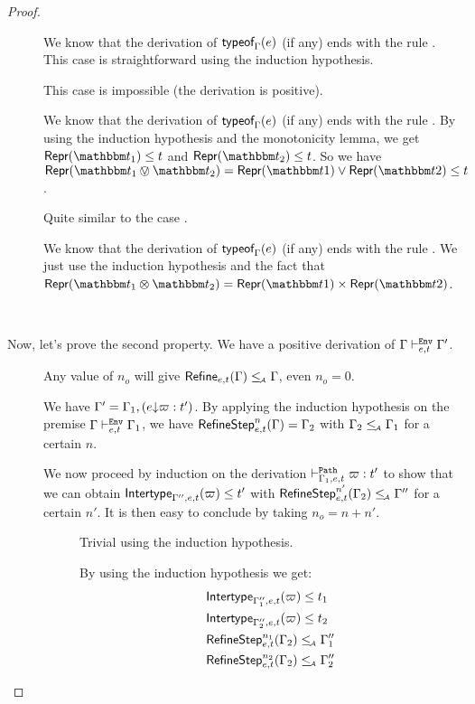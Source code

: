\documentclass[a4paper]{article}
\theoremstyle{definition}
\begin{document}
\begin{proof}
\begin{description}
    \item[] We know that the derivation of $\textsf{typeof}_{\Gamma}(e)$ (if any) ends with the rule .
    This case is straightforward using the induction hypothesis.
    \item[] This case is impossible (the derivation is positive).
    \item[] We know that the derivation of $\textsf{typeof}_{\Gamma}(e)$ (if any) ends with the rule .
    By using the induction hypothesis and the monotonicity lemma, we get $\tsrep{\ts_1}\leq t$ and $\tsrep{\ts_2}\leq t$.
    So we have $\tsrep{\ts_1\tsor\ts_2}=\tsrep{\ts1}\vee\tsrep{\ts2}\leq t$.
    \item[] Quite similar to the case .
    \item[] We know that the derivation of $\textsf{typeof}_{\Gamma}(e)$ (if any) ends with the rule .
    We just use the induction hypothesis and the fact that $\tsrep{\ts_1\tstimes\ts_2}=\pair {\tsrep{\ts1}} {\tsrep{\ts2}}$.
  \end{description}

  \ 

  Now, let's prove the second property. We have a positive derivation of $\Gamma \vdash^{\texttt{Env}}_{e,t} \Gamma'$.

  \begin{description}
    \item[] Any value of $n_o$ will give $\textsf{Refine}_{e,t}(\Gamma) \leq_{\!\scriptscriptstyle\mathcal{A}} \Gamma$, even $n_o = 0$.
    \item[] We have $\Gamma' = \Gamma_1,(e{\downarrow}\varpi:t')$.
    By applying the induction hypothesis on the premise $\Gamma \vdash^{\texttt{Env}}_{e,t} \Gamma_1$, we have
    $\textsf{RefineStep}_{e,t}^n (\Gamma) = \Gamma_2$ with $\Gamma_2 \leq_{\!\scriptscriptstyle\mathcal{A}} \Gamma_1$ for a certain $n$.

    We now proceed by induction on the derivation $\vdash^{\texttt{Path}}_{\Gamma_1,e,t} \varpi:t'$
    to show that we can obtain $\textsf{Intertype}_{\Gamma'',e,t} (\varpi) \leq t'$ with $\textsf{RefineStep}_{e,t}^{n'} (\Gamma_2) \leq_{\!\scriptscriptstyle\mathcal{A}} \Gamma''$
    for a certain $n'$. It is then easy to conclude by taking $n_o = n+n'$.

    \begin{description}
      \item[] Trivial using the induction hypothesis.
      \item[] By using the induction hypothesis we get:
      \begin{align*}
        &\textsf{Intertype}_{\Gamma_1'',e,t} (\varpi) \leq t_1\\
        &\textsf{Intertype}_{\Gamma_2'',e,t} (\varpi) \leq t_2\\
        &\textsf{RefineStep}_{e,t}^{n_1} (\Gamma_2) \leq_{\!\scriptscriptstyle\mathcal{A}} \Gamma_1''\\
        &\textsf{RefineStep}_{e,t}^{n_2} (\Gamma_2) \leq_{\!\scriptscriptstyle\mathcal{A}} \Gamma_2''
      \end{align*}
      

\end{description}
\end{description}
\end{proof}
\end{document}
